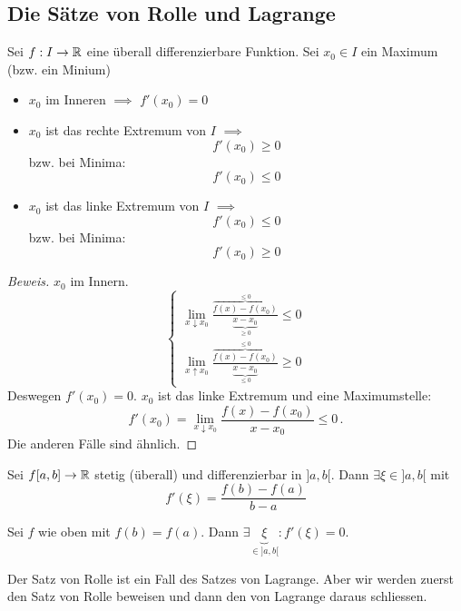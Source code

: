 \subsection{Die S\"atze von Rolle und Lagrange}

\begin{Sat}
  Sei $f:I\to\mathbb{R}$ eine überall differenzierbare Funktion. 
Sei $x_0\in I$ ein Maximum (bzw. ein Minium)
  \begin{itemize}
    \item $x_0$ im Inneren $\implies$ $f'(x_0)=0$
    \item $x_0$ ist das rechte Extremum von $I$ $\implies$
      \[f'(x_0)\geq 0\]
      bzw. bei Minima:
      \[f'(x_0)\leq 0\]
    \item $x_0$ ist das linke Extremum von $I$ $\implies$
      \[f'(x_0)\leq 0\]
      bzw. bei Minima:
      \[f'(x_0)\geq 0\]
  \end{itemize}
\end{Sat}
\begin{proof}[Beweis]
  $x_0$ im Innern.
  \[\begin{cases}
    \lim_{x\downarrow x_0} \frac{\overbrace{f(x)-f(x_0)}^{\leq 0}}{\underbrace{x-x_0}_{\geq 0}}\leq 0\\
    \lim_{x\uparrow x_0} \frac{\overbrace{f(x)-f(x_0)}^{\leq 0}}{\underbrace{x-x_0}_{\leq 0}}\geq 0
  \end{cases}\]
Deswegen $f'(x_0)=0$.
  $x_0$ ist das linke Extremum und eine Maximumstelle:
  \[f'(x_0)=\lim_{x\downarrow x_0}\frac{f(x)-f(x_0)}{x-x_0}\leq 0\, .\]
Die anderen F\"alle sind \"ahnlich.
\end{proof}
\begin{Sat}\label{s:lagrange}
  Sei $f[a,b]\to\mathbb{R}$ stetig (überall) und differenzierbar in $]a,b[$. Dann $\exists \xi\in ]a,b[$ mit
  \[f'(\xi)=\frac{f(b)-f(a)}{b-a}\]
\end{Sat}
\begin{Sat}[Rolle]\label{s:rolle}
  Sei $f$ wie oben mit $f(b)=f(a)$. Dann $\exists\underbrace{\xi}_{\in ]a,b[}:f'(\xi)=0$.
\end{Sat}

Der Satz von Rolle ist ein Fall des Satzes von Lagrange. Aber wir werden
zuerst den Satz von Rolle beweisen und dann den von Lagrange daraus schliessen.

